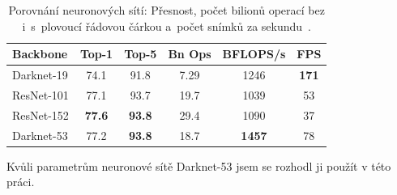 \begin{table}[H]
	\vskip6pt
	\centering
    \begin{tabular}{ l | c c c c c }
        Backbone & Top-1 & Top-5 & Bn Ops & BFLOPS/s & FPS \\
        \toprule
        Darknet-19 & 74.1 & 91.8 & 7.29 & 1246 & \textbf{171} \\
        ResNet-101 & 77.1 & 93.7 & 19.7 & 1039 & 53 \\
        ResNet-152 & \textbf{77.6} & \textbf{93.8} & 29.4 & 1090 & 37 \\
        Darknet-53 & 77.2 & \textbf{93.8} & 18.7 & \textbf{1457} & 78 \\
    \end{tabular}
    \caption{Porovnání neuronových sítí: Přesnost, počet bilionů operací bez i~s~plovoucí řádovou čárkou a~počet snímků za sekundu~\cite{yolov3}.} 
    \vskip6pt
    \label{tab:porovnaniBackbones}
\end{table}

 Kvůli parametrům neuronové sítě Darknet-53 jsem se rozhodl ji použít v této práci.

